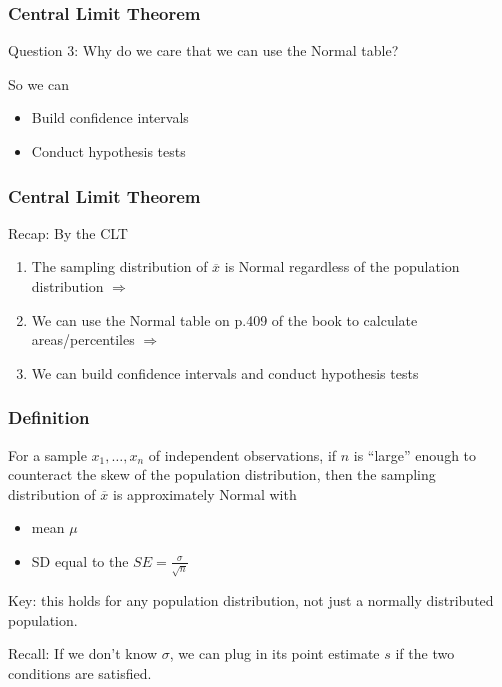 \documentclass[handout]{beamer}
\newcommand{\blue}[1]{\textcolor{blue2}{#1}}
\newcommand{\xbar}{\overline{x}}
\begin{document}
\begin{frame}
\frametitle{Central Limit Theorem}
\blue{Question 3}:  Why do we care that we can use the Normal table?

\vspace{0.25cm}

So we can
\begin{itemize}
\item Build confidence intervals
\item Conduct hypothesis tests
\end{itemize}

\end{frame}


\begin{frame}
\frametitle{Central Limit Theorem}
\blue{Recap}:  By the CLT

\begin{enumerate}
\item The sampling distribution of $\xbar$ is Normal \blue{regardless} of the population distribution $\Longrightarrow$
\item We can use the Normal table on p.409 of the book to calculate areas/percentiles $\Longrightarrow$
\item We can build confidence intervals and conduct hypothesis tests
\end{enumerate}


\end{frame}


\begin{frame}
\frametitle{Definition}

%
%
For a sample $x_1, \ldots, x_n$ of \blue{independent} observations, if $n$ is ``large'' enough to counteract the skew of the population distribution, then the sampling distribution of $\xbar$ is approximately Normal with
\begin{itemize}
\item mean $\mu$
\item SD equal to the $SE=\frac{\sigma}{\sqrt{n}}$
\end{itemize}

\vspace{0.25cm}

\pause\blue{Key}:  this holds for any population distribution, not just a normally distributed population.  

\vspace{0.25cm}

\pause \blue{Recall}: If we don't know $\sigma$, we can plug in its point estimate $s$ if the two conditions are satisfied.  


\end{frame}
\end{document}
